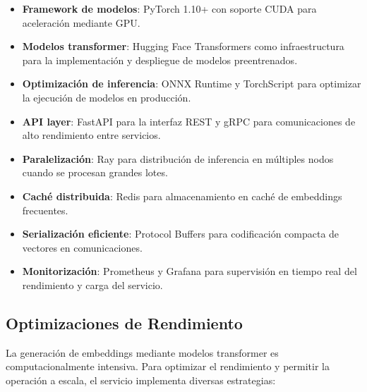 \documentclass[12pt,a4paper]{article}
\begin{document}
\begin{itemize}
    \item \textbf{Framework de modelos}: PyTorch 1.10+ con soporte CUDA para aceleración mediante GPU.
    
    \item \textbf{Modelos transformer}: Hugging Face Transformers como infraestructura para la implementación y despliegue de modelos preentrenados.
    
    \item \textbf{Optimización de inferencia}: ONNX Runtime y TorchScript para optimizar la ejecución de modelos en producción.
    
    \item \textbf{API layer}: FastAPI para la interfaz REST y gRPC para comunicaciones de alto rendimiento entre servicios.
    
    \item \textbf{Paralelización}: Ray para distribución de inferencia en múltiples nodos cuando se procesan grandes lotes.
    
    \item \textbf{Caché distribuida}: Redis para almacenamiento en caché de embeddings frecuentes.
    
    \item \textbf{Serialización eficiente}: Protocol Buffers para codificación compacta de vectores en comunicaciones.
    
    \item \textbf{Monitorización}: Prometheus y Grafana para supervisión en tiempo real del rendimiento y carga del servicio.
\end{itemize}

\subsection{Optimizaciones de Rendimiento}
\label{subsec:es-optimizacion}

La generación de embeddings mediante modelos transformer es computacionalmente intensiva. Para optimizar el rendimiento y permitir la operación a escala, el servicio implementa diversas estrategias:
\end{document}
